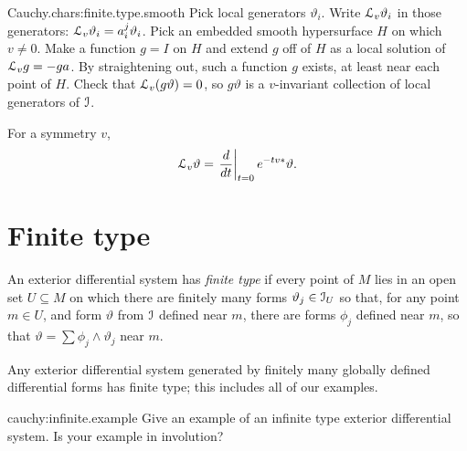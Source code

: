 \begin{answer}{Cauchy.chars:finite.type.smooth}
Pick local generators \(\vartheta_i\).
Write \(\EuScript L_v\vartheta_i\) in those generators: \(\EuScript L_v\vartheta_i=a^j_i\vartheta_i\).
Pick an embedded smooth hypersurface \(H\) on which \(v\ne0\).
Make a function \(g=I\) on \(H\) and extend \(g\) off of \(H\) as a local solution of \(\EuScript L_v g = -ga\).
By straightening out, such a function \(g\) exists, at least near each point of \(H\).
Check that \(\EuScript L_v (g\vartheta)=0\), so \(g\vartheta\) is a \(v\)-invariant collection of local generators of \(\mathcal{I}\).

For a symmetry \(v\),
\[
\EuScript L_v \vartheta=\left.\frac{d}{dt}\right|_{t=0} e^{-tv*}\vartheta.
\]
\end{answer}

\section{Finite type}
An exterior differential system has \emph{finite type} if every point of \(M\) lies in an open set \(U\subseteq M\) on which there are finitely many forms \(\vartheta_j \in \mathcal{I}_U\) so that, for any point \(m \in U\), and form \(\vartheta\) from \(\mathcal{I}\) defined near \(m\), there are forms \(\phi_j\) defined near \(m\), so that \(\vartheta=\sum \phi_j \wedge \vartheta_j\) near \(m\).
\begin{example}
Any exterior differential system generated by finitely many globally defined differential forms has finite type; this includes all of our examples.
\end{example}
\begin{problem}{cauchy:infinite.example}
Give an example of an infinite type exterior differential system.
Is your example in involution?
\end{problem}
